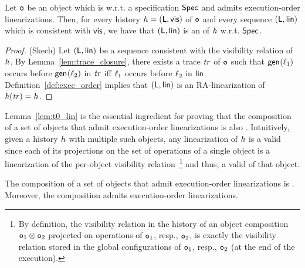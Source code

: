 \begin{lemma}\label{lem:t0_lin}
Let $\mathtt{o}$ be an object which is \crdtlinearizable{} w.r.t. a specification $\mathsf{Spec}$ and admits execution-order linearizations. Then, for every history ${h}=(\mathsf{L},\mathsf{vis})$ of $\mathtt{o}$ and every sequence $(\mathsf{L},\mathsf{lin})$ which is consistent with $\mathsf{vis}$, we have that $(\mathsf{L},\mathsf{lin})$ is an \crdtlinearization{} of ${h}$ w.r.t. $\mathsf{Spec}$.
\end{lemma}
\vspace{-10pt}
\begin{proof}(Skech)
Let $(\mathsf{L},\mathsf{lin})$ be a sequence consistent with the visibility relation of ${h}$. By Lemma~\ref{lem:trace_closure}, there exists a trace $\mathit{tr}$ of $\mathtt{o}$ such that  $\mathsf{gen}_{}(\ell_1)$ occurs before $\mathsf{gen}_{}(\ell_2)$ in $\mathit{tr}$ iff $\ell_1$ occurs before $\ell_2$ in $\mathsf{lin}$. Definition~\ref{def:exec_order} implies that $(\mathsf{L},\mathsf{lin})$ is an RA-linearization of $\mathit{h}({\mathit{tr})}={h}$.
\end{proof}

Lemma~\ref{lem:t0_lin} is the essential ingredient for proving that the composition of a set of \crdtlinearizable{} objects that admit execution-order linearizations is also \crdtlinearizable{}. Intuitively, given a history ${h}$ with multiple such objects, any linearization of ${h}$ is a valid \crdtlinearization{} since each of its projections on the set of operations of a single object is a linearization of the per-object visibility relation~\footnote{By definition, the visibility relation in the history of an object composition $\mathtt{o}_1\otimes\mathtt{o}_2$ projected on operations of $\mathtt{o}_1$, resp., $\mathtt{o}_2$, is exactly the visibility relation stored in the global configurations of $\mathtt{o}_1$, resp., $\mathtt{o}_2$ (at the end of the execution).}  and thus, a valid \crdtlinearization{} of that object.

\begin{theorem}\label{th:comp_execution_order}
The composition of a set of \crdtlinearizable{} objects that admit execution-order linearizations is \crdtlinearizable{}. Moreover, the composition admits execution-order linearizations.
\end{theorem}
\vspace{-\topsep}


